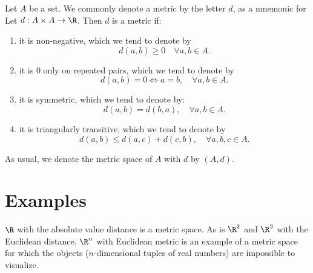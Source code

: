 Let $A$ be a set.
We commonly denote a metric by the letter $d$, as a mnemonic for 
Let $d: A \times  A \to \R $.
Then $d$ is a metric if:
    \begin{enumerate}
      \item it is non-negative, which we tend to denote by
        \[
d(a, b) \geq 0 \quad \forall a,b \in A.
        \]
      \item it is $0$ only on repeated pairs, which we tend to denote by
        \[
d(a, b) = 0 \iff a = b, \quad \forall a,b \in A.
        \]
      \item it is symmetric, which we tend to denote by:
        \[
d(a, b) = d(b, a), \quad \forall a,b \in A.
        \]
      \item it is triangularly transitive, which we tend to denote by
        \[
d(a, b) \leq d(a, c) + d(c, b), \quad \forall a,b,c \in A.
        \]
    \end{enumerate}
As usual, we denote the metric space of $A$ with $d$ by $(A, d)$.

\section*{Examples}

$\R $ with the absolute value distance is a metric space.
As is $\R ^2$ and $\R ^3$ with the Euclidean distance.
$\R ^n$ with Euclidean metric is an example of a metric space for which the objects ($n$-dimensional tuples of real numbers) are impossible to visualize.
